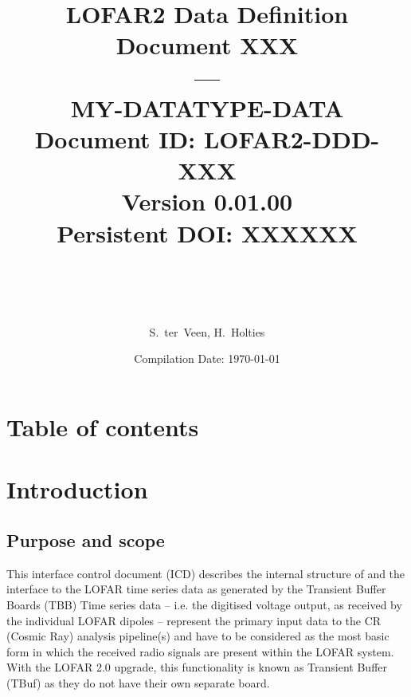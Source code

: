 \documentclass[a4paper,10pt,bibtotoc]{scrartcl}
\begin{document}
\title{LOFAR2 Data Definition Document XXX \\ --- \\ MY-DATATYPE-DATA \\
  {\normalsize Document ID: LOFAR2-DDD-XXX} \\
  {\normalsize Version 0.01.00} \\
  {\normalsize Persistent DOI: XXXXXX} \\
\author{ \parbox{\linewidth}{\centering S.~ter~Veen, H.~Holties } }
\date{\small{Compilation Date: \today}} \\

  
}

\maketitle


\section{Table of contents}
\tableofcontents

\listoffigures

\listoftables

\clearpage










\clearpage


\section{Introduction}
\label{sec:introduction}

\subsection{Purpose and scope}
\label{sec:purpose and scope}

This interface control document (ICD) describes the internal structure
of and the interface to the LOFAR time series data as generated by the Transient Buffer Boards (TBB) 
 Time series data -- i.e. the digitised voltage output, as received by the individual
LOFAR dipoles -- represent the primary input data to the CR (Cosmic
Ray) analysis pipeline(s) and have to be considered as the most basic
form in which the received radio signals are present within the LOFAR
system. With the LOFAR 2.0 upgrade, this functionality is known as Transient Buffer (TBuf) as they do not have their own separate board.
\end{document}

